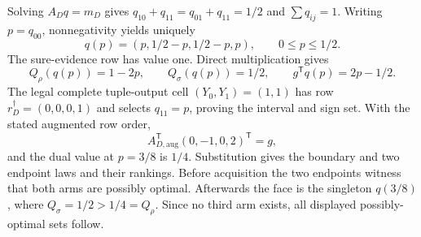 Solving \(A_Dq=m_D\) gives \(q_{10}+q_{11}=q_{01}+q_{11}=1/2\) and \(\sum q_{ij}=1\).  Writing \(p=q_{00}\), nonnegativity yields uniquely
\[
q(p)=(p,1/2-p,1/2-p,p),\qquad0\leq p\leq1/2.
\]
The sure-evidence row has value one.  Direct multiplication gives
\[
Q_\rho(q(p))=1-2p,\qquad Q_\sigma(q(p))=1/2,
\qquad g^{\mathsf T}q(p)=2p-1/2.
\]
The legal complete tuple-output cell \((Y_0,Y_1)=(1,1)\) has row \(r_D^\dagger=(0,0,0,1)\) and selects \(q_{11}=p\), proving the interval and sign set.  With the stated augmented row order,
\[
A_{D,\mathrm{aug}}^{\mathsf T}(0,-1,0,2)^{\mathsf T}=g,
\]
and the dual value at \(p=3/8\) is \(1/4\).  Substitution gives the boundary and two endpoint laws and their rankings.  Before acquisition the two endpoints witness that both arms are possibly optimal.  Afterwards the face is the singleton \(q(3/8)\), where \(Q_\sigma=1/2>1/4=Q_\rho\).  Since no third arm exists, all displayed possibly-optimal sets follow.